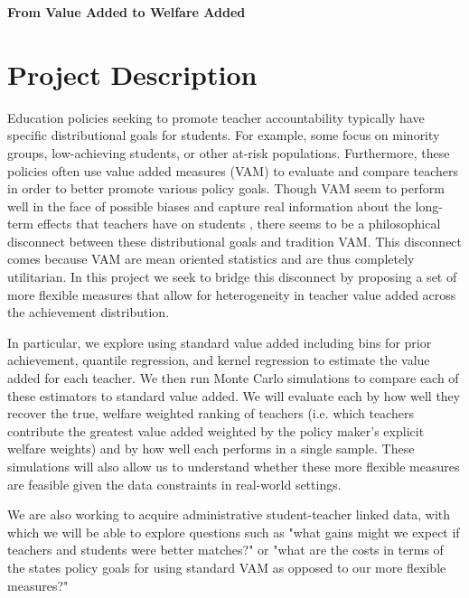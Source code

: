 \documentclass[letterpaper,12pt]{article}
\begin{document}
\begin{center}
    \noindent \textbf{From Value Added to Welfare Added}
\end{center}





\section{Project Description}

Education policies seeking to promote teacher accountability typically have specific distributional goals for students. For example, some focus on minority groups, low-achieving students, or other at-risk populations. Furthermore, these policies often use value added measures (VAM) to evaluate and compare teachers in order to better promote various policy goals. Though VAM seem to perform well in the face of possible biases and capture real information about the long-term effects that teachers have on students \citep{chetty2014measuring1, chetty2014measuring2}, there seems to be a philosophical disconnect between these distributional goals and tradition VAM. This disconnect comes because VAM are mean oriented statistics and are thus completely utilitarian. In this project we seek to bridge this disconnect by proposing a set of more flexible measures that allow for heterogeneity in teacher value added across the achievement distribution.

In particular, we explore using standard value added including bins for prior achievement, quantile regression, and kernel regression to estimate the value added for each teacher. We then run Monte Carlo simulations to compare each of these estimators to standard value added. We will evaluate each by how well they recover the true, welfare weighted ranking of teachers (i.e. which teachers contribute the greatest value added weighted by the policy maker's explicit welfare weights) and by how well each performs in a single sample. These simulations will also allow us to understand whether these more flexible measures are feasible given the data constraints in real-world settings.

We are also working to acquire administrative student-teacher linked data, with which we will be able to explore questions such as "what gains might we expect if teachers and students were better matches?" or "what are the costs in terms of the states policy goals for using standard VAM as opposed to our more flexible measures?"
\end{document}
